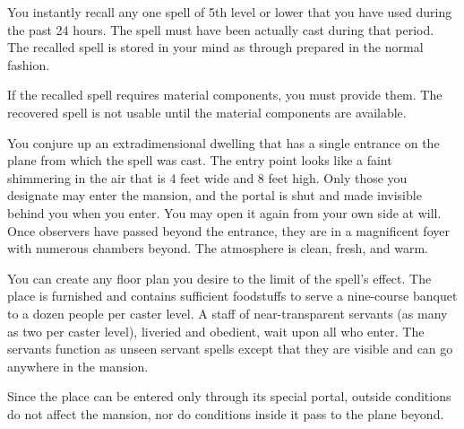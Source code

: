 \begin{multicols}{2}
\begin{small}

\noindent You instantly recall any one spell of 5th level or lower that you have used during the past 24 hours. The spell must have been actually cast during that period. The recalled spell is stored in your mind as through prepared in the normal fashion.

\smallskip\noindent If the recalled spell requires material components, you must provide them. The recovered spell is not usable until the material components are available.

\noindent You conjure up an extradimensional dwelling that has a single entrance on the plane from which the spell was cast. The entry point looks like a faint shimmering in the air that is 4 feet wide and 8 feet high. Only those you designate may enter the mansion, and the portal is shut and made invisible behind you when you enter. You may open it again from your own side at will. Once observers have passed beyond the entrance, they are in a magnificent foyer with numerous chambers beyond. The atmosphere is clean, fresh, and warm.

\smallskip\noindent You can create any floor plan you desire to the limit of the spell's effect. The place is furnished and contains sufficient foodstuffs to serve a nine-course banquet to a dozen people per caster level. A staff of near-transparent servants (as many as two per caster level), liveried and obedient, wait upon all who enter. The servants function as unseen servant spells except that they are visible and can go anywhere in the mansion.

\smallskip\noindent Since the place can be entered only through its special portal, outside conditions do not affect the mansion, nor do conditions inside it pass to the plane beyond.


\end{small}
\end{multicols}
